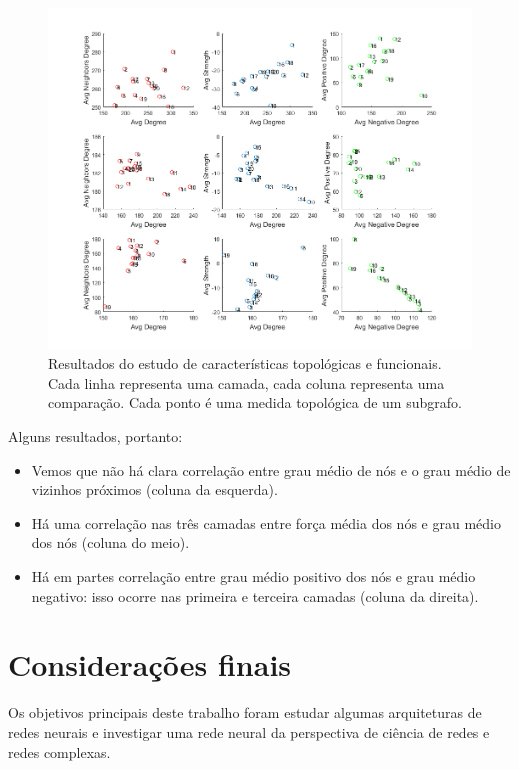 \documentclass{article}
\begin{document}
            \begin{figure}[h!]
                \centering
                \includegraphics[scale=0.35]{Images/Structure vs function.png}
                \caption{Resultados do estudo de características topológicas e funcionais.
                Cada linha representa uma camada, cada coluna representa uma comparação.
                Cada ponto é uma medida topológica de um subgrafo.}
                \label{fig6}
            \end{figure}

            Alguns resultados, portanto:

            \begin{itemize}
                \item Vemos que não há clara correlação entre grau médio de nós e o grau médio de vizinhos próximos (coluna da esquerda).
                \item Há uma correlação nas três camadas entre força média dos nós e grau médio dos nós (coluna do meio).
                \item Há em partes correlação entre grau médio positivo dos nós e grau médio negativo: isso ocorre nas primeira e terceira camadas (coluna da direita).
            \end{itemize}

    \section{Considerações finais}

        Os objetivos principais deste trabalho foram estudar algumas arquiteturas de redes neurais e investigar uma rede neural da perspectiva de ciência de redes e redes complexas.
\end{document}
